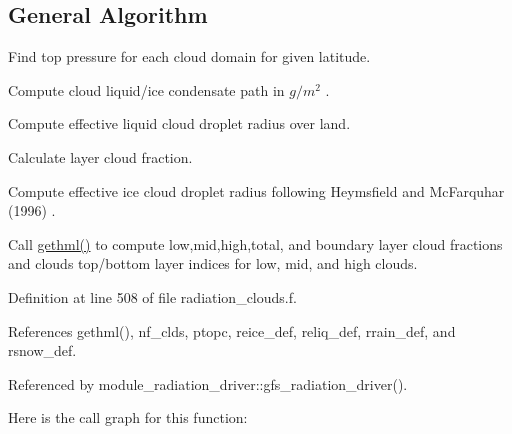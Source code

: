 \hypertarget{group__module__radiation__clouds_gen_progcld1}{}\subsection{General Algorithm}\label{group__module__radiation__clouds_gen_progcld1}

\begin{DoxyEnumerate}
\item Find top pressure for each cloud domain for given latitude.
\item Compute cloud liquid/ice condensate path in $ g/m^2 $ .
\item Compute effective liquid cloud droplet radius over land.
\item Calculate layer cloud fraction.
\item Compute effective ice cloud droplet radius following Heymsfield and Mc\+Farquhar (1996) \cite{heymsfield_and_mcfarquhar_1996}.
\item Call \hyperlink{group__module__radiation__clouds_gac231d967afcfb252dedba82e9085b34d}{gethml()} to compute low,mid,high,total, and boundary layer cloud fractions and clouds top/bottom layer indices for low, mid, and high clouds. 
\end{DoxyEnumerate}

Definition at line 508 of file radiation\+\_\+clouds.\+f.



References gethml(), nf\+\_\+clds, ptopc, reice\+\_\+def, reliq\+\_\+def, rrain\+\_\+def, and rsnow\+\_\+def.



Referenced by module\+\_\+radiation\+\_\+driver\+::gfs\+\_\+radiation\+\_\+driver().

Here is the call graph for this function\+:
\mbox{\label{group__module__radiation__clouds_ga3fd7643ce526761b17d04eec6a332333}} 
